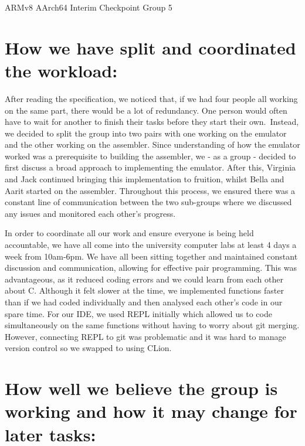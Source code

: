 \documentclass[11pt]{article}
\begin{document}
{ARMv8 AArch64 Interim Checkpoint Group 5}

\hypertarget{h.z7gbdr1o83yk}{%
\section{\texorpdfstring{{How we have split and coordinated the
workload:}}{How we have split and coordinated the workload:}}\label{h.z7gbdr1o83yk}}

{}

{After reading the specification, we noticed that, if we had four people
all working on the same part, there would be a lot of redundancy. One
person would often have to wait for another to finish their tasks before
they start their own.}{~Instead, we decided to split the group into two
pairs with one working on the emulator and the other working on the
assembler. Since understanding of how the emulator worked was a
prerequisite to building the assembler, we - as a group - decided to
first discuss a broad approach to implementing the emulator. After this,
Virginia and Jack continued bringing this implementation to fruition,
whilst Bella and Aarit started on the assembler. Throughout this
process, we ensured there was a constant line of communication between
the two sub-groups where we discussed any issues and monitored each
other's progress.}

{}

{In order to coordinate all our work and ensure everyone is being held
accountable, we have all come into the university computer labs at least
4 days a week from 10am-6pm. We have all been sitting together and
maintained constant discussion and communication, allowing for effective
pair programming. This was advantageous, as it reduced coding errors and
we could learn from each other about C. Although it felt slower at the
time, we implemented functions faster than if we had coded individually
and then analysed each other's code in our spare time. For our IDE, we
used REPL initially which allowed us to code simultaneously on the same
functions without having to worry about git merging. However, connecting
REPL to git was problematic and it was hard to manage version control so
we swapped to using CLion.}

{}

\hypertarget{h.xzqlrvx87o4t}{%
\section{\texorpdfstring{{How well we believe the group is working and
how it may change for later
tasks:}}{How well we believe the group is working and how it may change for later tasks:}}\label{h.xzqlrvx87o4t}}
\end{document}
